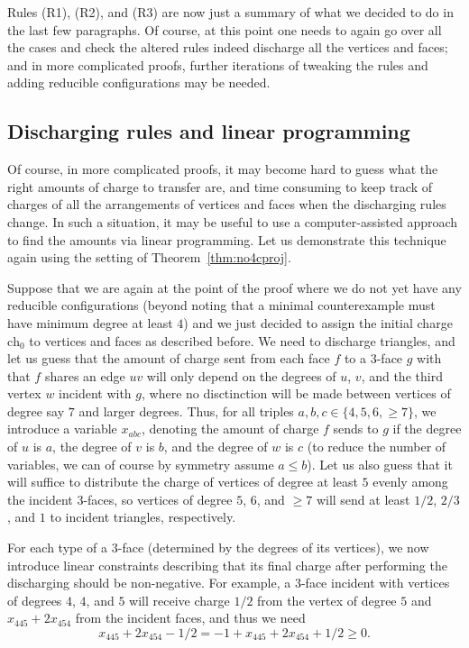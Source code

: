 \documentclass[12pt,twoside,openright,a4paper]{book}
\newcommand{\initch}{\text{ch}_0}
\begin{document}
Rules (R1), (R2), and (R3) are now just a summary of what we decided to do in the last few paragraphs.
Of course, at this point one needs to again go over all the cases and check the altered rules indeed
discharge all the vertices and faces; and in more complicated proofs, further iterations of tweaking the rules
and adding reducible configurations may be needed.

\subsection{Discharging rules and linear programming}

Of course, in more complicated proofs, it may become hard to guess what the right amounts of charge to
transfer are, and time consuming to keep track of charges of all the arrangements of vertices and faces
when the discharging rules change.  In such a situation, it may be useful to use a computer-assisted approach
to find the amounts via linear programming.  Let us demonstrate this technique again using the setting
of Theorem~\ref{thm:no4cproj}.

Suppose that we are again at the point of the proof where we do not yet have any reducible configurations
(beyond noting that a minimal counterexample must have minimum degree at least $4$)
and we just decided to assign the initial charge $\initch$ to vertices and faces as described before.
We need to discharge triangles, and let us guess that the amount of charge sent from each face $f$ to a $3$-face $g$
with that $f$ shares an edge $uv$ will only depend on the degrees of $u$, $v$, and the third vertex $w$ incident with $g$,
where no disctinction will
be made between vertices of degree say $7$ and larger degrees.  Thus, for all triples $a,b,c\in\{4,5,6,{\ge\!7}\}$,
we introduce a variable $x_{abc}$, denoting the amount of charge $f$ sends to $g$ if the degree of $u$ is $a$, the degree of $v$ is $b$,
and the degree of $w$ is $c$ (to reduce the number of variables, we can of course by symmetry assume $a\le b$).
Let us also guess that it will suffice to distribute the charge of vertices of degree at least $5$ evenly
among the incident $3$-faces, so vertices of degree $5$, $6$, and $\ge\!7$ will send at least $1/2$, $2/3$, and $1$ to incident triangles,
respectively.

For each type of a $3$-face (determined by the degrees of its vertices), we now introduce linear constraints
describing that its final charge after performing the discharging should be non-negative.  For example, a $3$-face
incident with vertices of degrees $4$, $4$, and $5$ will receive charge $1/2$ from the vertex of degree $5$ and
$x_{445}+2x_{454}$ from the incident faces, and thus we need
$$x_{445}+2x_{454}-1/2=-1+x_{445}+2x_{454}+1/2\ge 0.$$
\end{document}
